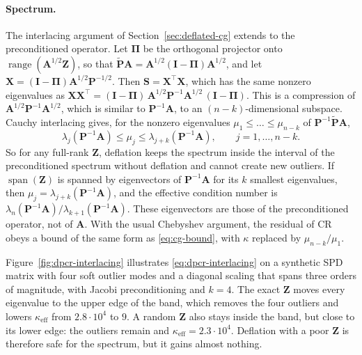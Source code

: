 \paragraph{Spectrum.}
The interlacing argument of Section~\ref{sec:deflated-cg} extends to the
preconditioned operator. Let $\boldsymbol{\Pi}$ be the orthogonal projector
onto $\operatorname{range}(\mathbf{A}^{1/2}\mathbf{Z})$, so that
$\tilde{\mathbf{P}}\mathbf{A} = \mathbf{A}^{1/2}(\mathbf{I} - \boldsymbol{\Pi})\mathbf{A}^{1/2}$,
and let $\mathbf{X} = (\mathbf{I} - \boldsymbol{\Pi})\mathbf{A}^{1/2}\mathbf{P}^{-1/2}$.
Then $\mathbf{S} = \mathbf{X}^\top\mathbf{X}$, which has the same nonzero
eigenvalues as
$\mathbf{X}\mathbf{X}^\top = (\mathbf{I} - \boldsymbol{\Pi})\,\mathbf{A}^{1/2}\mathbf{P}^{-1}\mathbf{A}^{1/2}\,(\mathbf{I} - \boldsymbol{\Pi})$.
This is a compression of $\mathbf{A}^{1/2}\mathbf{P}^{-1}\mathbf{A}^{1/2}$,
which is similar to $\mathbf{P}^{-1}\mathbf{A}$, to an $(n-k)$-dimensional
subspace. Cauchy interlacing gives, for the nonzero eigenvalues
$\mu_1 \le \dots \le \mu_{n-k}$ of $\mathbf{P}^{-1}\tilde{\mathbf{P}}\mathbf{A}$,
\begin{equation}
  \lambda_j(\mathbf{P}^{-1}\mathbf{A}) \le \mu_j \le \lambda_{j+k}(\mathbf{P}^{-1}\mathbf{A}),
  \qquad j = 1, \dots, n-k .
  \label{eq:dpcr-interlacing}
\end{equation}
So for any full-rank $\mathbf{Z}$, deflation keeps the spectrum inside the
interval of the preconditioned spectrum without deflation and cannot create
new outliers. If $\operatorname{span}(\mathbf{Z})$ is spanned by eigenvectors
of $\mathbf{P}^{-1}\mathbf{A}$ for its $k$ smallest eigenvalues, then
$\mu_j = \lambda_{j+k}(\mathbf{P}^{-1}\mathbf{A})$, and the effective
condition number is $\lambda_n(\mathbf{P}^{-1}\mathbf{A})/\lambda_{k+1}(\mathbf{P}^{-1}\mathbf{A})$.
These eigenvectors are those of the preconditioned operator, not of
$\mathbf{A}$. With the usual Chebyshev argument, the residual of CR obeys a
bound of the same form as \eqref{eq:cg-bound}, with $\kappa$ replaced by
$\mu_{n-k}/\mu_1$.

Figure~\ref{fig:dpcr-interlacing} illustrates \eqref{eq:dpcr-interlacing}
on a synthetic SPD matrix with four soft outlier modes and a diagonal
scaling that spans three orders of magnitude, with Jacobi preconditioning
and $k = 4$. The exact $\mathbf{Z}$ moves every eigenvalue to the upper
edge of the band, which removes the four outliers and lowers
$\kappa_{\mathrm{eff}}$ from $2.8 \cdot 10^4$ to $9$. A random $\mathbf{Z}$
also stays inside the band, but close to its lower edge: the outliers
remain and $\kappa_{\mathrm{eff}} = 2.3 \cdot 10^4$. Deflation with a poor
$\mathbf{Z}$ is therefore safe for the spectrum, but it gains almost nothing.

